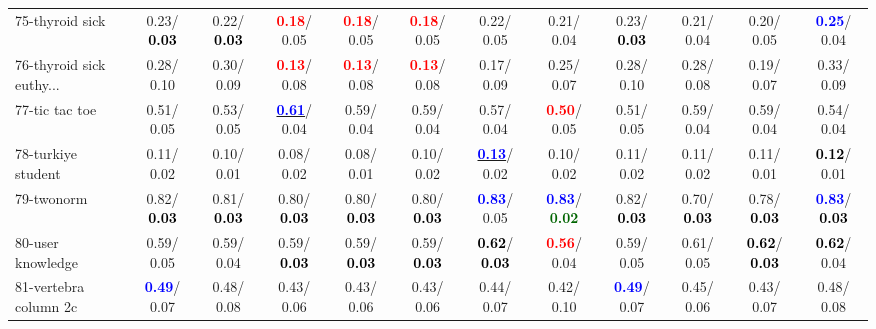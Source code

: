 \begin{table}[h]
\begin{center}
{\begin{tabular}{lc|c|c|c|c|c|c|c|c|c|c}
75-thyroid sick &   0.23/\textcolor{black}{\textbf{  0.03}} &   0.22/\textcolor{black}{\textbf{  0.03}} & \textcolor{red}{\textbf{  0.18}}/  0.05 & \textcolor{red}{\textbf{  0.18}}/  0.05 & \textcolor{red}{\textbf{  0.18}}/  0.05 &   0.22/  0.05 &   0.21/  0.04 &   0.23/\textcolor{black}{\textbf{  0.03}} &   0.21/  0.04 &   0.20/  0.05 & \textcolor{blue}{\textbf{  0.25}}/  0.04 \\
76-thyroid sick euthy... &   0.28/  0.10 &   0.30/  0.09 & \textcolor{red}{\textbf{  0.13}}/  0.08 & \textcolor{red}{\textbf{  0.13}}/  0.08 & \textcolor{red}{\textbf{  0.13}}/  0.08 &   0.17/  0.09 &   0.25/  0.07 &   0.28/  0.10 &   0.28/  0.08 &   0.19/  0.07 &   0.33/  0.09 \\
77-tic tac toe &   0.51/  0.05 &   0.53/  0.05 & \underline{\textcolor{blue}{\textbf{  0.61}}}/  0.04 &   0.59/  0.04 &   0.59/  0.04 &   0.57/  0.04 & \textcolor{red}{\textbf{  0.50}}/  0.05 &   0.51/  0.05 &   0.59/  0.04 &   0.59/  0.04 &   0.54/  0.04 \\
78-turkiye student &   0.11/  0.02 &   0.10/  0.01 &   0.08/  0.02 &   0.08/  0.01 &   0.10/  0.02 & \underline{\textcolor{blue}{\textbf{  0.13}}}/  0.02 &   0.10/  0.02 &   0.11/  0.02 &   0.11/  0.02 &   0.11/  0.01 & \textcolor{black}{\textbf{  0.12}}/  0.01 \\ \hline
79-twonorm &   0.82/\textcolor{black}{\textbf{  0.03}} &   0.81/\textcolor{black}{\textbf{  0.03}} &   0.80/\textcolor{black}{\textbf{  0.03}} &   0.80/\textcolor{black}{\textbf{  0.03}} &   0.80/\textcolor{black}{\textbf{  0.03}} & \textcolor{blue}{\textbf{  0.83}}/  0.05 & \textcolor{blue}{\textbf{  0.83}}/\textcolor{darkgreen}{\textbf{  0.02}} &   0.82/\textcolor{black}{\textbf{  0.03}} &   0.70/\textcolor{black}{\textbf{  0.03}} &   0.78/\textcolor{black}{\textbf{  0.03}} & \textcolor{blue}{\textbf{  0.83}}/\textcolor{black}{\textbf{  0.03}} \\
80-user knowledge &   0.59/  0.05 &   0.59/  0.04 &   0.59/\textcolor{black}{\textbf{  0.03}} &   0.59/\textcolor{black}{\textbf{  0.03}} &   0.59/\textcolor{black}{\textbf{  0.03}} & \textcolor{black}{\textbf{  0.62}}/\textcolor{black}{\textbf{  0.03}} & \textcolor{red}{\textbf{  0.56}}/  0.04 &   0.59/  0.05 &   0.61/  0.05 & \textcolor{black}{\textbf{  0.62}}/\textcolor{black}{\textbf{  0.03}} & \textcolor{black}{\textbf{  0.62}}/  0.04 \\
81-vertebra column 2c & \textcolor{blue}{\textbf{  0.49}}/  0.07 &   0.48/  0.08 &   0.43/  0.06 &   0.43/  0.06 &   0.43/  0.06 &   0.44/  0.07 &   0.42/  0.10 & \textcolor{blue}{\textbf{  0.49}}/  0.07 &   0.45/  0.06 &   0.43/  0.07 &   0.48/  0.08 \\

\end{tabular}}
\end{center}
\end{table}

